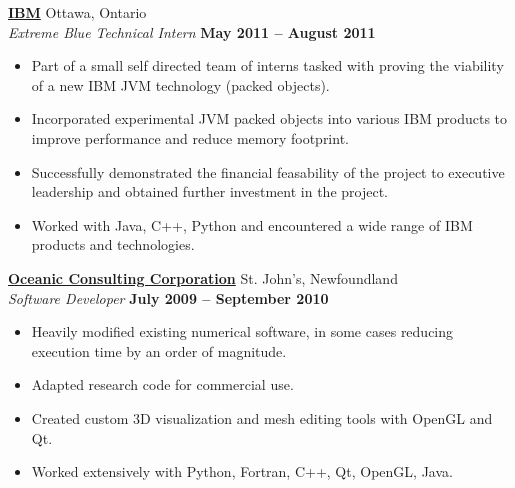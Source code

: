 \documentclass[margin,line]{res}
\begin{document}
\begin{resume}
\begin{itemize}
      \end{itemize}  

        \href{http://www.ibm.com/ca/en/}{\bf IBM} {\hfill Ottawa, Ontario}\\
      {\em Extreme Blue Technical Intern} \hfill {\bf May 2011 -- August 2011}
      \begin{itemize} \itemsep -2pt
        \item Part of a small self directed team of interns tasked with proving the viability of a new IBM JVM technology (packed objects).
        \item Incorporated experimental JVM packed objects into various IBM products to improve performance and reduce memory footprint.
        \item Successfully demonstrated the financial feasability of the project to executive leadership and obtained further investment in the project.
        \item Worked with Java, C++, Python and encountered a wide range of IBM products and technologies.
      \end{itemize}
    

	\href{http://www.oceaniccorp.com}{\bf Oceanic Consulting Corporation} {\hfill St. John's, Newfoundland}\\
      {\em Software Developer} \hfill {\bf July 2009 -- September 2010}
      \begin{itemize} \itemsep -2pt
        \item Heavily modified existing numerical software, in some cases reducing execution time by an order of magnitude.
        \item Adapted research code for commercial use.
        \item Created custom 3D visualization and mesh editing tools with OpenGL and Qt.
        \item Worked extensively with Python, Fortran, C++, Qt, OpenGL, Java.
      \end{itemize}



\end{resume}
\end{document}
